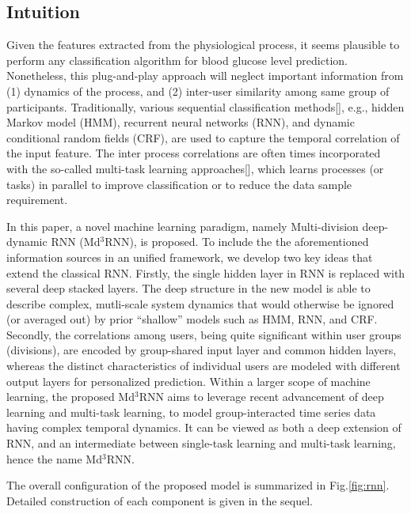 
\subsection{Intuition}
Given the features extracted from the physiological process, it seems plausible to perform any classification algorithm for blood glucose level prediction. Nonetheless, this plug-and-play approach will neglect important information from (1) dynamics of the process, and (2) inter-user similarity among same group of participants. Traditionally, various sequential classification methods[], e.g., hidden Markov model (HMM), recurrent neural networks (RNN), and dynamic conditional random fields (CRF), are used to capture the temporal correlation of the input feature. The inter process correlations are often times incorporated with the so-called multi-task learning approaches[], which learns processes (or tasks) in parallel to improve classification or to reduce the data sample requirement. 

In this paper, a novel machine learning paradigm, namely Multi-division deep-dynamic RNN (Md$^3$RNN), is proposed. To include the the aforementioned information sources in an unified framework, we develop two key ideas that extend the classical RNN. Firstly, the single hidden layer in RNN is replaced with several deep stacked layers. The deep structure in the new model is able to describe complex, mutli-scale system dynamics that would otherwise be ignored (or averaged out) by prior ``shallow'' models such as HMM, RNN, and CRF. Secondly, the correlations among users, being quite significant within user groups (divisions), are encoded by group-shared input layer and common hidden layers, whereas the distinct characteristics of individual users are modeled with  different output layers for personalized prediction. Within a larger scope of machine learning, the proposed Md$^3$RNN aims to leverage recent advancement of deep learning and multi-task learning, to model group-interacted time series data having complex temporal dynamics. It can be viewed as both a deep extension of RNN, and an intermediate between single-task learning and multi-task learning, hence the name Md$^3$RNN.

The overall configuration of the proposed model is summarized in Fig.\ref{fig:rnn}. Detailed construction of each component is given in the sequel.     

